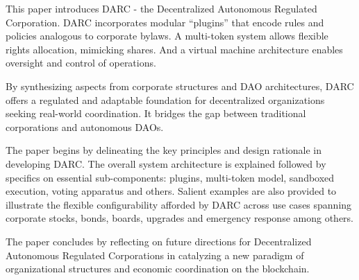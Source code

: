 \documentclass{article}
\begin{document}
This paper introduces DARC - the Decentralized Autonomous Regulated Corporation. DARC incorporates modular ``plugins'' that encode rules and policies analogous to corporate bylaws. A multi-token system allows flexible rights allocation, mimicking shares. And a virtual machine architecture enables oversight and control of operations.

By synthesizing aspects from corporate structures and DAO architectures, DARC offers a regulated and adaptable foundation for decentralized organizations seeking real-world coordination. It bridges the gap between traditional corporations and autonomous DAOs.

The paper begins by delineating the key principles and design rationale in developing DARC. The overall system architecture is explained followed by specifics on essential sub-components: plugins, multi-token model, sandboxed execution, voting apparatus and others. Salient examples are also provided to illustrate the flexible configurability afforded by DARC across use cases spanning corporate stocks, bonds, boards, upgrades and emergency response among others.

The paper concludes by reflecting on future directions for Decentralized Autonomous Regulated Corporations in catalyzing a new paradigm of organizational structures and economic coordination on the blockchain.







































\end{document}

